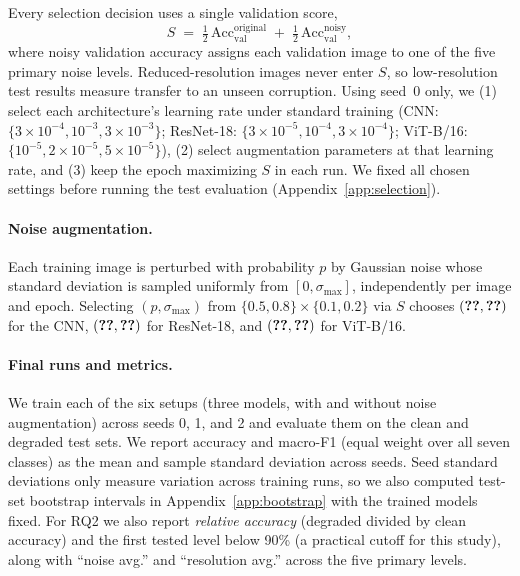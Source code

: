 \documentclass{article}
\begin{document}
Every selection decision uses a single validation score,
\begin{equation}
  S \;=\; \tfrac12\,\mathrm{Acc}_{\text{val}}^{\text{original}} \;+\; \tfrac12\,\mathrm{Acc}_{\text{val}}^{\text{noisy}},
  \label{eq:score}
\end{equation}
where noisy validation accuracy assigns each validation image to one of the five primary noise levels.
Reduced-resolution images never enter $S$, so low-resolution test results measure transfer to an unseen corruption.
Using seed~0 only, we (1) select each architecture's learning rate under standard training (CNN:
$\{3{\times}10^{-4}, 10^{-3}, 3{\times}10^{-3}\}$; ResNet-18: $\{3{\times}10^{-5}, 10^{-4}, 3{\times}10^{-4}\}$;
ViT-B/16: $\{10^{-5}, 2{\times}10^{-5}, 5{\times}10^{-5}\}$), (2) select augmentation parameters at that learning
rate, and (3) keep the epoch maximizing $S$ in each run. We fixed all chosen settings before running the test
evaluation (Appendix~\ref{app:selection}).

\paragraph{Noise augmentation.}
Each training image is perturbed with probability $p$ by Gaussian noise whose standard deviation is sampled uniformly
from $[0,\sigma_{\max}]$, independently per image and epoch. Selecting $(p,\sigma_{\max})$ from
$\{0.5, 0.8\}\times\{0.1, 0.2\}$ via $S$ chooses $(\num{augp@cnn}, \num{augsigma@cnn})$ for the CNN,
$(\num{augp@resnet18}, \num{augsigma@resnet18})$ for ResNet-18, and $(\num{augp@vit_b16}, \num{augsigma@vit_b16})$
for ViT-B/16.

\paragraph{Final runs and metrics.}
We train each of the six setups (three models, with and without noise augmentation) across seeds 0, 1, and 2 and
evaluate them on the clean and degraded test sets. We report accuracy and macro-F1 (equal weight over all seven
classes) as the mean and sample standard deviation across seeds. Seed standard deviations only measure variation across
training runs, so we also computed test-set bootstrap intervals in Appendix~\ref{app:bootstrap} with the trained models
fixed. For RQ2 we also report \emph{relative accuracy} (degraded divided by clean accuracy) and
the first tested level below 90\% (a practical cutoff for this study), along with ``noise avg.'' and ``resolution
avg.'' across the five primary levels.
\end{document}

